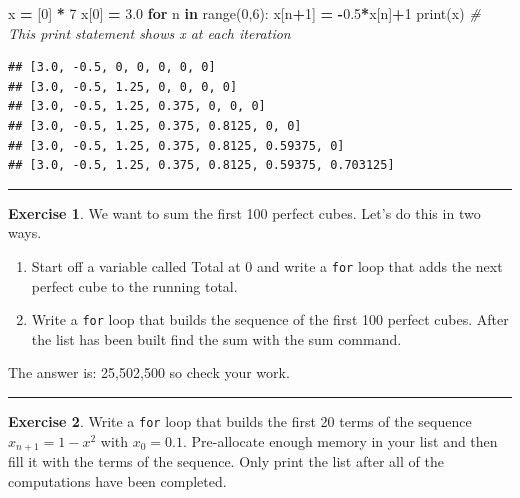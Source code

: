 \documentclass[
]{book}
\newenvironment{Shaded}{\begin{snugshade}}{\end{snugshade}}
\newcommand{\BuiltInTok}[1]{#1}
\newcommand{\CommentTok}[1]{\textcolor[rgb]{0.56,0.35,0.01}{\textit{#1}}}
\newcommand{\ControlFlowTok}[1]{\textcolor[rgb]{0.13,0.29,0.53}{\textbf{#1}}}
\newcommand{\DecValTok}[1]{\textcolor[rgb]{0.00,0.00,0.81}{#1}}
\newcommand{\FloatTok}[1]{\textcolor[rgb]{0.00,0.00,0.81}{#1}}
\newcommand{\KeywordTok}[1]{\textcolor[rgb]{0.13,0.29,0.53}{\textbf{#1}}}
\newcommand{\NormalTok}[1]{#1}
\newcommand{\OperatorTok}[1]{\textcolor[rgb]{0.81,0.36,0.00}{\textbf{#1}}}
\theoremstyle{definition}
\theoremstyle{definition}
\theoremstyle{definition}
\newtheorem{exercise}{Exercise}[chapter]
\theoremstyle{remark}
\begin{document}
\begin{Shaded}
\begin{Highlighting}[]
\NormalTok{x }\OperatorTok{=}\NormalTok{ [}\DecValTok{0}\NormalTok{] }\OperatorTok{*} \DecValTok{7}
\NormalTok{x[}\DecValTok{0}\NormalTok{] }\OperatorTok{=} \FloatTok{3.0}
\ControlFlowTok{for}\NormalTok{ n }\KeywordTok{in} \BuiltInTok{range}\NormalTok{(}\DecValTok{0}\NormalTok{,}\DecValTok{6}\NormalTok{):}
\NormalTok{    x[n}\OperatorTok{+}\DecValTok{1}\NormalTok{] }\OperatorTok{=} \OperatorTok{{-}}\FloatTok{0.5}\OperatorTok{*}\NormalTok{x[n]}\OperatorTok{+}\DecValTok{1}
    \BuiltInTok{print}\NormalTok{(x) }\CommentTok{\# This print statement shows x at each iteration}
\end{Highlighting}
\end{Shaded}

\begin{verbatim}
## [3.0, -0.5, 0, 0, 0, 0, 0]
## [3.0, -0.5, 1.25, 0, 0, 0, 0]
## [3.0, -0.5, 1.25, 0.375, 0, 0, 0]
## [3.0, -0.5, 1.25, 0.375, 0.8125, 0, 0]
## [3.0, -0.5, 1.25, 0.375, 0.8125, 0.59375, 0]
## [3.0, -0.5, 1.25, 0.375, 0.8125, 0.59375, 0.703125]
\end{verbatim}

\begin{center}\rule{0.5\linewidth}{0.5pt}\end{center}

\begin{exercise}
\protect\hypertarget{exr:unnamed-chunk-665}{}{\label{exr:unnamed-chunk-665} }We want to sum the first 100 perfect cubes. Let's do this in two ways.

\begin{enumerate}
\def\labelenumi{\alph{enumi}.}
\item
  Start off a variable called Total at 0 and write a \texttt{for} loop that adds the next perfect cube to the running total.
\item
  Write a \texttt{for} loop that builds the sequence of the first 100 perfect cubes. After the list has been built find the sum with the sum command.
\end{enumerate}

The answer is: 25,502,500 so check your work.
\end{exercise}

\begin{center}\rule{0.5\linewidth}{0.5pt}\end{center}

\begin{exercise}
\protect\hypertarget{exr:unnamed-chunk-666}{}{\label{exr:unnamed-chunk-666} }Write a \texttt{for} loop that builds the first 20 terms of the sequence \(x_{n+1}=1-x^2\) with \(x_0=0.1\). Pre-allocate enough memory in your list and then fill it with the terms of the sequence. Only print the list after all of the computations have been completed.
\end{exercise}
\end{document}
